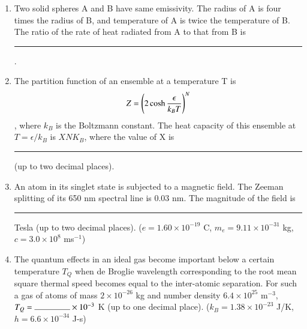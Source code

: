 \documentclass[journal,12pt,onecolumn]{IEEEtran}
\theoremstyle{remark}
\begin{document}
\begin{enumerate}
    \item Two solid spheres A and B have same emissivity. The radius of A is four times the radius of B, and temperature of A is twice the temperature of B. The ratio of the rate of heat radiated from A to that from B is \rule{1.5cm}{0.4pt}.\hfill{}

    \item The partition function of an ensemble at a temperature T is \begin{align*}Z = \left(2 \cosh \frac{\epsilon}{k_B T}\right)^N\end{align*}, where $k_B$ is the Boltzmann constant. The heat capacity of this ensemble at $T = \epsilon/k_B$ is $XNK_B$, where the value of X is \rule{1.5cm}{0.4pt} (up to two decimal places).\hfill{}

    \item An atom in its singlet state is subjected to a magnetic field. The Zeeman splitting of its 650 nm spectral line is 0.03 nm. The magnitude of the field is \rule{1.5cm}{0.4pt} Tesla (up to two decimal places). ($e = 1.60 \times 10^{-19}$ C, $m_e = 9.11 \times 10^{-31}$ kg, $c = 3.0 \times 10^8$ ms$^{-1}$)\hfill{}

    \item The quantum effects in an ideal gas become important below a certain temperature $T_Q$ when de Broglie wavelength corresponding to the root mean square thermal speed becomes equal to the inter-atomic separation. For such a gas of atoms of mass $2 \times 10^{-26}$ kg and number density $6.4 \times 10^{25} \text{ m}^{-3}$, $T_Q = \rule{1.5cm}{0.4pt} \times 10^{-3}$ K (up to one decimal place). ($k_B = 1.38 \times 10^{-23}$ J/K, $h = 6.6 \times 10^{-34}$ J-s)\hfill{}
\end{enumerate}
\end{document}
